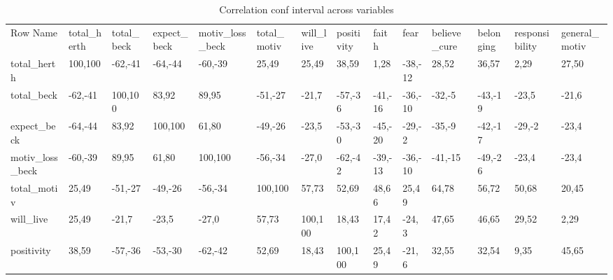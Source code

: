 \begin{sidewaystable}[H] 
 \caption{Correlation conf interval across variables} 
 \label{Correlation_conf_interval_across_variables} 
 \centering 
  \begin{tabular} {|l|l|l|l|l|l|l|l|l|l|l|l|l|l|}  
 \hline 
 Row Name &  total_herth & total_beck & expect_beck & motiv_loss_beck & total_motiv & will_live & positivity & faith & fear & believe_cure & belonging & responsibility & general_motiv \\ 
 total_herth & {\color{green}100,100} & {\color{red}-62,-41} & {\color{red}-64,-44} & {\color{red}-60,-39} & {\color{green}25,49} & {\color{green}25,49} & {\color{green}38,59} & {\color{green}1,28} & {\color{red}-38,-12} & {\color{green}28,52} & {\color{green}36,57} & {\color{green}2,29} & {\color{green}27,50} \\ 
 total_beck & {\color{red}-62,-41} & {\color{green}100,100} & {\color{green}83,92} & {\color{green}89,95} & {\color{red}-51,-27} & -21,7 & {\color{red}-57,-36} & {\color{red}-41,-16} & {\color{red}-36,-10} & {\color{red}-32,-5} & {\color{red}-43,-19} & -23,5 & -21,6 \\ 
 expect_beck & {\color{red}-64,-44} & {\color{green}83,92} & {\color{green}100,100} & {\color{green}61,80} & {\color{red}-49,-26} & -23,5 & {\color{red}-53,-30} & {\color{red}-45,-20} & {\color{red}-29,-2} & {\color{red}-35,-9} & {\color{red}-42,-17} & {\color{red}-29,-2} & -23,4 \\ 
 motiv_loss_beck & {\color{red}-60,-39} & {\color{green}89,95} & {\color{green}61,80} & {\color{green}100,100} & {\color{red}-56,-34} & -27,0 & {\color{red}-62,-42} & {\color{red}-39,-13} & {\color{red}-36,-10} & {\color{red}-41,-15} & {\color{red}-49,-26} & -23,4 & -23,4 \\ 
 total_motiv & {\color{green}25,49} & {\color{red}-51,-27} & {\color{red}-49,-26} & {\color{red}-56,-34} & {\color{green}100,100} & {\color{green}57,73} & {\color{green}52,69} & {\color{green}48,66} & {\color{green}25,49} & {\color{green}64,78} & {\color{green}56,72} & {\color{green}50,68} & {\color{green}20,45} \\ 
 will_live & {\color{green}25,49} & -21,7 & -23,5 & -27,0 & {\color{green}57,73} & {\color{green}100,100} & {\color{green}18,43} & {\color{green}17,42} & -24,3 & {\color{green}47,65} & {\color{green}46,65} & {\color{green}29,52} & {\color{green}2,29} \\ 
 positivity & {\color{green}38,59} & {\color{red}-57,-36} & {\color{red}-53,-30} & {\color{red}-62,-42} & {\color{green}52,69} & {\color{green}18,43} & {\color{green}100,100} & {\color{green}25,49} & -21,6 & {\color{green}32,55} & {\color{green}32,54} & {\color{green}9,35} & {\color{green}45,65} \\ 

\end{tabular}
\end{sidewaystable}
